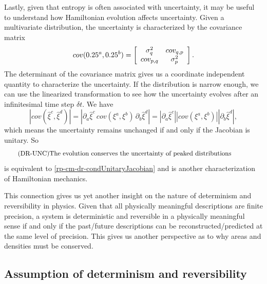Lastly, given that entropy is often associated with uncertainty, it may be useful to understand how Hamiltonian evolution affects uncertainty. Given a multivariate distribution, the uncertainty is characterized by the covariance matrix
\begin{equation}
	cov(\xi^a, \xi^b) = \left[\begin{array}{ c c }
		\sigma^2_q & cov_{q, p} \\
		cov_{p, q} & \sigma^2_p \\
	\end{array} \right].
\end{equation}
The determinant of the covariance matrix gives us a coordinate independent quantity to characterize the uncertainty. If the distribution is narrow enough, we can use the linearized transformation to see how the uncertainty evolves after an infinitesimal time step $\delta t$. We have
\begin{equation}
	\left| cov(\hat{\xi}^c, \hat{\xi}^d) \right| = \left| \partial_a \hat{\xi}^c  \, cov(\xi^a, \xi^b) \, \partial_b \hat{\xi}^d  \right| = \left| \partial_a \hat{\xi}^c \right| \left| cov(\xi^a, \xi^b) \right| \left| \partial_b \hat{\xi}^d  \right|,
\end{equation}
which means the uncertainty remains unchanged if and only if the Jacobian is unitary. So
\begin{equation}\label{rp-cm-dr-condUncertainty}
	\tag{DR-UNC}
	\eqtext{The evolution conserves the uncertainty of peaked distributions}	
\end{equation}
is equivalent to \ref{rp-cm-dr-condUnitaryJacobian} and is another characterization of Hamiltonian mechanics.


This connection gives us yet another insight on the nature of determinism and reversibility in physics. Given that all physically meaningful descriptions are finite precision, a system is deterministic and reversible in a physically meaningful sense if and only if the past/future descriptions can be reconstructed/predicted at the same level of precision. This gives us another perspective as to why areas and densities must be conserved.

\subsection{Assumption of determinism and reversibility}

